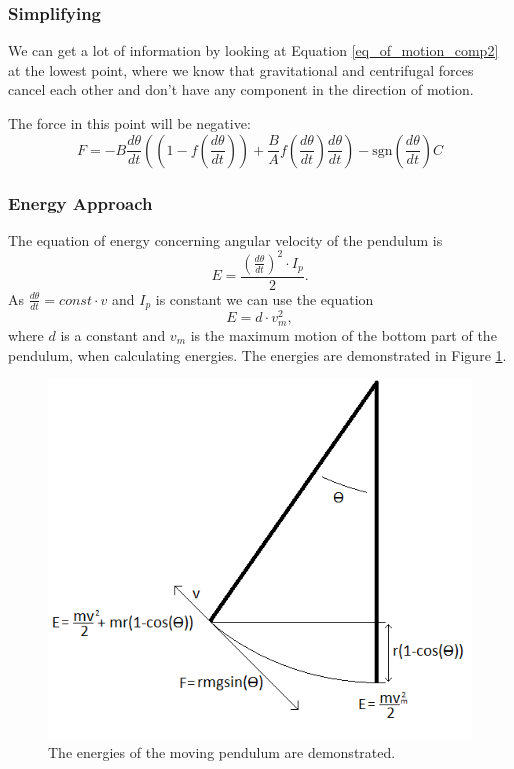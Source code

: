 \documentclass[11pt, a4paper]{article}
\begin{document}
\subsubsection{Simplifying}

We can get a lot of information by looking at Equation \ref{eq_of_motion_comp2}
at the lowest point, where we know that gravitational and centrifugal forces
cancel each other and don't have any component in the direction of motion.

The force in this point will be negative:
\begin{equation}
  F = - B \frac{d\theta}{dt}
  \left(\left(1 - f\left(\frac{d\theta}{dt} \right)\right) + \frac{B}{A}f\left(\frac{d\theta}{dt}\right) \frac{d\theta}{dt} \right)  
  - \text{sgn}\left(\frac{d\theta}{dt}\right)C
\label{e:drag_comp}
\end{equation} 

\subsubsection{Energy Approach}
The equation of energy concerning angular velocity of the pendulum is
\[
	E = \frac{(\frac{d\theta}{dt})^2\cdot I_p }{2}.
\]
As $\frac{d\theta}{dt} = const\cdot v$ and $I_p$ is constant we can use the equation
\[
	E = d\cdot v_m^2,
\]
where $d$ is a constant and $v_m$ is the maximum motion of the bottom part of the pendulum, when calculating energies. 
The energies are demonstrated in Figure \ref{f:pendulummotion}.
\begin{figure}[h]
	\centering
	\includegraphics[scale=0.5]{pendulummotion}
	\caption{The energies of the moving pendulum are demonstrated.}
	\label{f:pendulummotion}
\end{figure}
\end{document}
